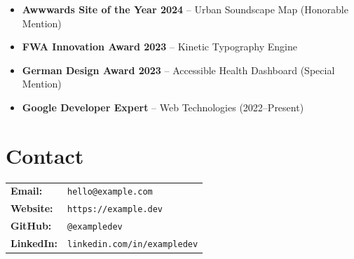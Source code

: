 \documentclass[
    language=english,
    doctype=personal-portfolio,
    institution=none,
]{../../omnilatex}
\begin{document}
\begin{itemize}
    \item \textbf{Awwwards Site of the Year 2024} -- Urban Soundscape Map (Honorable Mention)
    \item \textbf{FWA Innovation Award 2023} -- Kinetic Typography Engine
    \item \textbf{German Design Award 2023} -- Accessible Health Dashboard (Special Mention)
    \item \textbf{Google Developer Expert} -- Web Technologies (2022--Present)
\end{itemize}

\section{Contact}

\begin{center}
\begin{tabular}{ll}
\textbf{Email:} & \texttt{hello@example.com} \\
\textbf{Website:} & \texttt{https://example.dev} \\
\textbf{GitHub:} & \texttt{@exampledev} \\
\textbf{LinkedIn:} & \texttt{linkedin.com/in/exampledev} \\
\end{tabular}
\end{center}
\end{document}
